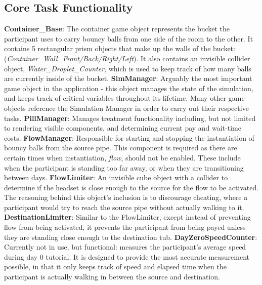 \documentclass{article}
\begin{document}
\subsection{Core Task Functionality} 
\textbf{Container\_Base}: The container game object represents the bucket the participant uses to carry bouncy balls from one side of the room to the other. It contains 5 rectangular prism objects that make up the walls of the bucket: (\textit{Container\_Wall\_Front\slash Back\slash Right\slash Left}). It also contains an invisible collider object, \textit{Water\_Droplet\_Counter}, which is used to keep track of how many balls are currently inside of the bucket.\newline \newline
\textbf{SimManager}: Arguably the most important game object in the application - this object manages the state of the simulation, and keeps track of critical variables throughout its lifetime. Many other game objects reference the Simulation Manager in order to carry out their respective tasks.\newline \newline
\textbf{PillManager}: Manages treatment functionality including, but not limited to rendering visible components, and determining current pay and wait-time costs.\newline \newline
\textbf{FlowManager}: Responsible for starting and stopping the instantiation of bouncy balls from the source pipe. This component is required as there are certain times when instantiation, \textit{flow}, should not be enabled. These include when the participant is standing too far away, or when they are transitioning between days. \newline \newline
\textbf{FlowLimiter}: An invisible cube object with a collider to determine if the headset is close enough to the source for the flow to be activated. The reasoning behind this object's inclusion is to discourage cheating, where a participant would try to reach the source pipe without actually walking to it. \newline \newline
\textbf{DestinationLimiter}: Similar to the FlowLimiter, except instead of preventing flow from being activated, it prevents the participant from being payed unless they are standing close enough to the destination tub.\newline \newline
\textbf{DayZeroSpeedCounter}: Currently not in use, but functional: measures the participant's average speed during day 0 tutorial. It is designed to provide the most accurate measurement possible, in that it only keeps track of speed and elapsed time when the participant is actually walking in between the source and destination.\newline \newline
\end{document}
